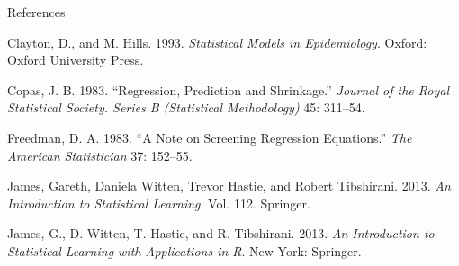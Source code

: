 \documentclass[10pt,ignorenonframetext,]{beamer}
\begin{document}
\begin{frame}{References}
\protect\hypertarget{references}{}

\hypertarget{refs}{}
\leavevmode\hypertarget{ref-clayton.hills1993}{}%
Clayton, D., and M. Hills. 1993. \emph{Statistical Models in
Epidemiology}. Oxford: Oxford University Press.

\leavevmode\hypertarget{ref-copas1983}{}%
Copas, J. B. 1983. ``Regression, Prediction and Shrinkage.''
\emph{Journal of the Royal Statistical Society. Series B (Statistical
Methodology)} 45: 311--54.

\leavevmode\hypertarget{ref-freedman1983}{}%
Freedman, D. A. 1983. ``A Note on Screening Regression Equations.''
\emph{The American Statistician} 37: 152--55.

\leavevmode\hypertarget{ref-ISL}{}%
James, Gareth, Daniela Witten, Trevor Hastie, and Robert Tibshirani.
2013. \emph{An Introduction to Statistical Learning}. Vol. 112.
Springer.

\leavevmode\hypertarget{ref-james.etal}{}%
James, G., D. Witten, T. Hastie, and R. Tibshirani. 2013. \emph{An
Introduction to Statistical Learning with Applications in R}. New York:
Springer.

\end{frame}
\end{document}
